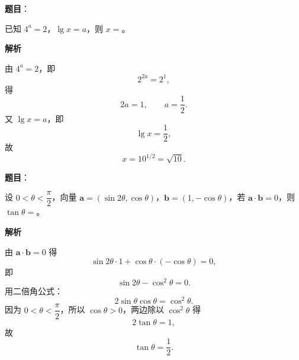 \begin{answer}

\textbf{题目}：

已知 $4^a=2$，$\lg x=a$，则 $x=$\gkblank{}。

\textbf{解析}

由 $4^a=2$，即
\nopagebreak[4]
\[2^{2a}=2^1,\]
得
\nopagebreak[4]
\[2a=1,\qquad a=\frac12.\]
又 $\lg x=a$，即
\nopagebreak[4]
\[\lg x=\frac12,\]
故
\nopagebreak[4]
\[x=10^{1/2}=\sqrt{10}.\]


\end{answer}
\begin{answer}

\textbf{题目}：

设 $0<\theta<\dfrac\pi2$，向量 $\boldsymbol a=(\sin2\theta,\cos\theta)$，$\boldsymbol b=(1,-\cos\theta)$，若 $\boldsymbol a\cdot\boldsymbol b=0$，则 $\tan\theta=$\gkblank{}。

\textbf{解析}

由 $\boldsymbol a\cdot\boldsymbol b=0$ 得
\nopagebreak[4]
\[\sin2\theta\cdot1+\cos\theta\cdot(-\cos\theta)=0,\]
即
\nopagebreak[4]
\[\sin2\theta-\cos^2\theta=0.\]
用二倍角公式：
\nopagebreak[4]
\[2\sin\theta\cos\theta=\cos^2\theta.\]
因为 $0<\theta<\dfrac\pi2$，所以 $\cos\theta>0$，两边除以 $\cos^2\theta$ 得
\nopagebreak[4]
\[2\tan\theta=1,\]
故
\nopagebreak[4]
\[\tan\theta=\frac12.\]


\end{answer}
